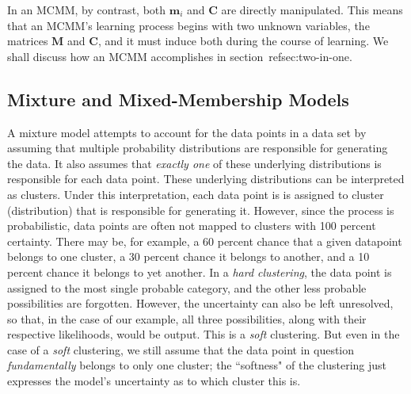In an MCMM, by contrast, both $\textbf{m}_i$ and $\textbf{C}$ are directly manipulated. This means that
an MCMM's learning process begins with two unknown variables, the matrices $\textbf{M}$ and 
$\textbf{C}$, and it must induce both during the course of learning. We shall discuss how an MCMM accomplishes in section~ref{sec:two-in-one}.

\subsection{Mixture and Mixed-Membership Models}

A mixture model attempts to account for the data points in a data set 
by assuming that multiple probability
distributions are responsible for generating the data. 
It also assumes that \emph{exactly one}
of these underlying distributions is responsible for each data point. 
 These underlying 
distributions can be interpreted as clusters. Under this interpretation, each data point is 
is assigned to cluster (distribution) that is responsible for generating it. 
However, since the process is probabilistic,
data points are often not mapped to clusters with 100 percent certainty. 
There may be, for example, a 60 percent chance that a given datapoint belongs to one 
cluster, a 30 percent chance it belongs to another, and a 10 percent chance 
it belongs to yet another. In a \emph{hard clustering}, the data point is 
assigned to the most single probable category, and the other less probable 
possibilities are forgotten. However, the uncertainty can also be left 
unresolved, so that, in the case of our example, all three possibilities, 
along with their respective likelihoods, would be output. This is a 
\emph{soft} clustering. But even in the case of a \emph{soft} clustering, 
we still assume that the data point in question \emph{fundamentally} belongs to only one cluster; 
the ``softness" of the clustering just expresses the model's uncertainty 
as to which cluster this is. %

